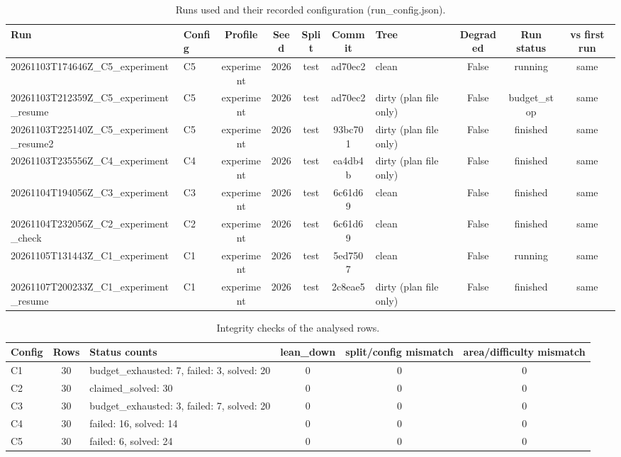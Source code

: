 
\begin{table}[t]
\centering
\scriptsize
\setlength{\tabcolsep}{3pt}
\caption{Runs used and their recorded configuration (run\_config.json).}
\label{tab:runs}
\begin{tabular}{llcccclccc}
\toprule
Run & Config & Profile & Seed & Split & Commit & Tree & Degraded & Run status & vs first run \\
\midrule
20261103T174646Z\_C5\_experiment & C5 & experiment & 2026 & test & ad70ec2 & clean & False & running & same \\
20261103T212359Z\_C5\_experiment\_resume & C5 & experiment & 2026 & test & ad70ec2 & dirty (plan file only) & False & budget\_stop & same \\
20261103T225140Z\_C5\_experiment\_resume2 & C5 & experiment & 2026 & test & 93bc701 & dirty (plan file only) & False & finished & same \\
20261103T235556Z\_C4\_experiment & C4 & experiment & 2026 & test & ea4db4b & dirty (plan file only) & False & finished & same \\
20261104T194056Z\_C3\_experiment & C3 & experiment & 2026 & test & 6c61d69 & clean & False & finished & same \\
20261104T232056Z\_C2\_experiment\_check & C2 & experiment & 2026 & test & 6c61d69 & clean & False & finished & same \\
20261105T131443Z\_C1\_experiment & C1 & experiment & 2026 & test & 5ed7507 & clean & False & running & same \\
20261107T200233Z\_C1\_experiment\_resume & C1 & experiment & 2026 & test & 2c8eae5 & dirty (plan file only) & False & finished & same \\
\bottomrule
\end{tabular}
\end{table}

\begin{table}[t]
\centering
\scriptsize
\setlength{\tabcolsep}{3pt}
\caption{Integrity checks of the analysed rows.}
\label{tab:checks}
\begin{tabular}{lclccc}
\toprule
Config & Rows & Status counts & lean\_down & split/config mismatch & area/difficulty mismatch \\
\midrule
C1 & 30 & budget\_exhausted: 7, failed: 3, solved: 20 & 0 & 0 & 0 \\
C2 & 30 & claimed\_solved: 30 & 0 & 0 & 0 \\
C3 & 30 & budget\_exhausted: 3, failed: 7, solved: 20 & 0 & 0 & 0 \\
C4 & 30 & failed: 16, solved: 14 & 0 & 0 & 0 \\
C5 & 30 & failed: 6, solved: 24 & 0 & 0 & 0 \\
\bottomrule
\end{tabular}
\end{table}

